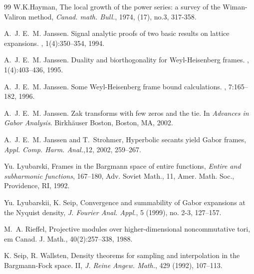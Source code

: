\documentclass[12pt]{amsart}
\begin{document}
\begin{thebibliography}{99}
 W.K.Hayman, 
The local growth of the power series: a survey of the 
Wiman-Valiron method,  {\em Canad. math. Bull.}, 1974, (17), no.3, 
317-358. 



A.~J. E.~M. Janssen.
\newblock Signal analytic proofs of two basic results on lattice expansions.
, 1(4):350--354, 1994.

A.~J. E.~M. Janssen.
\newblock Duality and biorthogonality for {W}eyl-{H}eisenberg frames.
, 1(4):403--436, 1995.

A.~J. E.~M. Janssen.
\newblock Some {W}eyl-{H}eisenberg frame bound calculations.
, 7:165--182, 1996.



A.~J. E.~M. Janssen.
\newblock Zak transforms with few zeros and the tie.
\newblock In {\em Advances in Gabor Analysis}. Birkh\"auser Boston, Boston, MA,
  2002.

A.~J. E.~M. Janssen and T.~Strohmer,
 Hyperbolic secants yield Gabor frames,
{\em Appl. Comp. Harm. Anal.},12,  2002,   259--267.



 Yu. Lyubarski,   Frames in the Bargmann space of entire functions, {\em Entire and subharmonic functions},  167--180, Adv. Soviet Math., 11, Amer. Math. Soc., Providence, RI, 1992.  

  Yu. Lyubarskii,  K. Seip,  Convergence and summability of Gabor expansions at the Nyquist density, {\em  J. Fourier Anal. Appl.},  5  (1999),  no. 2-3, 127--157.
 
 
 
 M.~A. Rieffel,
Projective modules over higher-dimensional noncommutative tori,
{em Canad. J. Math.}, 40(2):257--338, 1988.


 
 K. Seip, R. Wallsten,  Density theorems for sampling and interpolation in the Bargmann-Fock space. II,  {\em   J. Reine Angew. Math.},  429  (1992), 107--113.  

\end{thebibliography}



 
\end{document}
